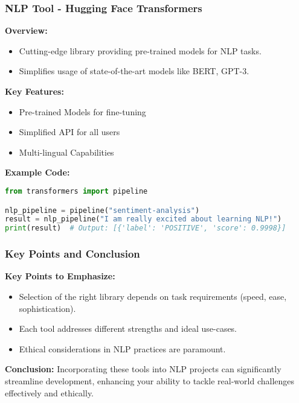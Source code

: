 \documentclass[aspectratio=169]{beamer}
\begin{document}
\begin{frame}[fragile]
    \frametitle{NLP Tool - Hugging Face Transformers}
    \textbf{Overview:}
    \begin{itemize}
        \item Cutting-edge library providing pre-trained models for NLP tasks.
        \item Simplifies usage of state-of-the-art models like BERT, GPT-3.
    \end{itemize}

    \textbf{Key Features:}
    \begin{itemize}
        \item Pre-trained Models for fine-tuning
        \item Simplified API for all users
        \item Multi-lingual Capabilities
    \end{itemize}

    \textbf{Example Code:}
    \begin{lstlisting}[language=Python]
from transformers import pipeline

nlp_pipeline = pipeline("sentiment-analysis")
result = nlp_pipeline("I am really excited about learning NLP!")
print(result)  # Output: [{'label': 'POSITIVE', 'score': 0.9998}]
    \end{lstlisting}
\end{frame}

\begin{frame}[fragile]
    \frametitle{Key Points and Conclusion}
    \textbf{Key Points to Emphasize:}
    \begin{itemize}
        \item Selection of the right library depends on task requirements (speed, ease, sophistication).
        \item Each tool addresses different strengths and ideal use-cases.
        \item Ethical considerations in NLP practices are paramount.
    \end{itemize}

    \textbf{Conclusion:}
    Incorporating these tools into NLP projects can significantly streamline development, enhancing your ability to tackle real-world challenges effectively and ethically. 
\end{frame}
\end{document}
